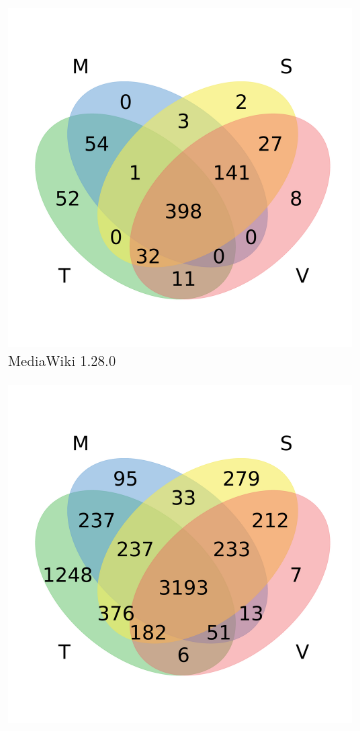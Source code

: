 \begin{figure}[t]
\begin{subfigure}[b]{0.24\textwidth}
          \includegraphics[width=\textwidth]{figures/lim/venn_mwk.pdf}
          \caption{\scriptsize MediaWiki 1.28.0}
          \label{fig:venn_mwk}
    \end{subfigure}
    \begin{subfigure}[b]{0.24\textwidth}
          \includegraphics[width=\textwidth]{figures/lim/venn_mgt.pdf}

\end{subfigure}
\end{figure}
